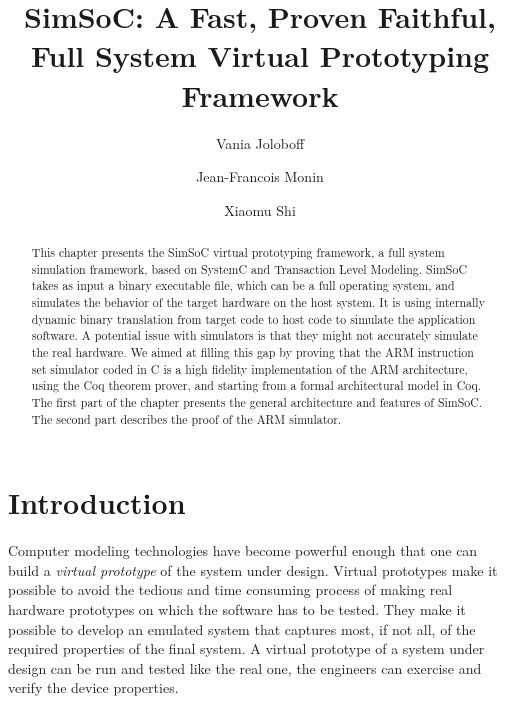 \documentclass{llncs}
\begin{document}
\setcounter{secnumdepth}{3}

\date{}

\title{SimSoC: A Fast, Proven Faithful, Full System Virtual Prototyping Framework}
\author{Vania Joloboff \and Jean\--Francois Monin
   \and Xiaomu Shi}
\maketitle
\thispagestyle{empty}

\begin{abstract}

  This chapter presents the SimSoC virtual prototyping framework, a
  full system simulation framework, based on SystemC and Transaction
  Level Modeling. SimSoC takes as input a binary executable file,
  which can be a full operating system, and simulates the behavior of
  the target hardware on the host system. It is using internally
  dynamic binary translation from target code to host code to simulate
  the application software. A potential issue with simulators is that
  they might not accurately simulate the real hardware. We aimed at
  filling this gap by proving that the ARM instruction set simulator
  coded in C is a high fidelity implementation of the ARM
  architecture, using the Coq theorem prover, and starting from a
  formal architectural model in Coq. The first part of the chapter
  presents the general architecture and features of SimSoC.  The
  second part describes the proof of the ARM simulator.
\end{abstract}

\section{Introduction}

Computer modeling technologies have become powerful enough that one
can build a {\em virtual prototype} of the system under design.
Virtual prototypes make it possible to avoid the tedious and time
consuming process of making real hardware prototypes on which the
software has to be tested. They make it possible to develop an
emulated system that captures most, if not all, of the required
properties of the final system. A virtual prototype of a system
under design can be run and tested like the real one, the engineers
can exercise and verify the device properties.
\end{document}
